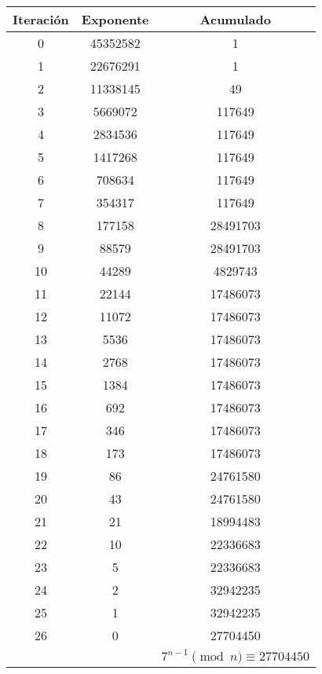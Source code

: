 \documentclass[fleqn]{article}
\begin{document}
\begin{center}
\begin{tabular}{c}
        \end{tabular}
        \begin{tabular}{c | c | c}
            Iteración & Exponente & Acumulado \\ \hline
            0 & 45352582 & 1 \\
            1 & 22676291 & 1 \\
            2 & 11338145 & 49 \\
            3 & 5669072 & 117649 \\
            4 & 2834536 & 117649 \\
            5 & 1417268 & 117649 \\
            6 & 708634 & 117649 \\
            7 & 354317 & 117649 \\
            8 & 177158 & 28491703 \\
            9 & 88579 & 28491703 \\
            10 & 44289 & 4829743 \\
            11 & 22144 & 17486073 \\
            12 & 11072 & 17486073 \\
            13 & 5536 & 17486073 \\
            14 & 2768 & 17486073 \\
            15 & 1384 & 17486073 \\
            16 & 692 & 17486073 \\
            17 & 346 & 17486073 \\
            18 & 173 & 17486073 \\
            19 & 86 & 24761580 \\
            20 & 43 & 24761580 \\
            21 & 21 & 18994483 \\
            22 & 10 & 22336683 \\
            23 & 5 & 22336683 \\
            24 & 2 & 32942235 \\
            25 & 1 & 32942235 \\
            26 & 0 & 27704450 \\ \hline
            && $ 7^{n-1} \pmod{n} \equiv 27704450 $
        \end{tabular}


\end{center}
\end{document}
